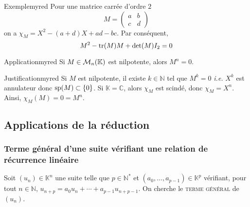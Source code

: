    \begin{omed}{Exemple}{myred}
        Pour une matrice carrée d’ordre $2$ 
        \[ M = \begin{pmatrix}
            a & b \\
            c & d
        \end{pmatrix} \]  
        on a $\chi_M = X^2 - (a+d)X + ad - bc$. Par conséquent, 
        \[ M^2 - \tr(M) M + \det(M) I_2 = 0 \]
    \end{omed}

    \begin{omed}{Application}{myred}
        Si $M \in \mk{n}$ est nilpotente, alors $M^n = 0$.
    \end{omed}

    \begin{demo}{Justification}{myred}
        Si $M$ est nilpotente, il existe $k \in \mathbb{N}$ tel que $M^k = 0$ \textit{i.e.} $X^k$ est annulateur donc $\sp(M) \subset \left\{0\right\}$. Si $\mathbb{K} = \mathbb{C}$, alors $\chi_M$ est scindé, donc $\chi_M = X^n$. Ainsi, $\chi_M(M) = 0 = M^n$.
    \end{demo}

\subsection{Applications de la réduction}

    \subsubsection{Terme général d’une suite vérifiant une relation de récurrence linéaire}

    Soit $(u_n) \in \mathbb{K}^n$ une suite telle que $p \in \mathbb{N}^*$ et $(a_0, \ldots, a_{p-1}) \in \mathbb{K}^p$ vérifiant, pour tout $n \in \mathbb{N}$, $u_{n+p} = a_0 u_n + \cdots + a_{p-1} u_{n + p-1}$. On cherche le \textsc{terme général} de $(u_n)$. 
    
